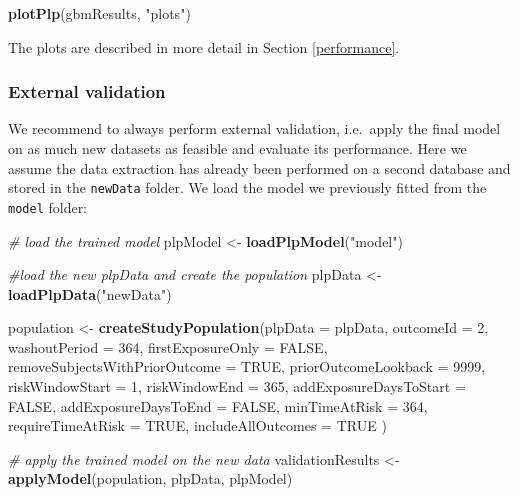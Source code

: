 \documentclass[11pt]{book}
\newenvironment{Shaded}{\begin{snugshade}}{\end{snugshade}}
\newcommand{\CommentTok}[1]{\textcolor[rgb]{0.56,0.35,0.01}{\textit{#1}}}
\newcommand{\DataTypeTok}[1]{\textcolor[rgb]{0.13,0.29,0.53}{#1}}
\newcommand{\DecValTok}[1]{\textcolor[rgb]{0.00,0.00,0.81}{#1}}
\newcommand{\KeywordTok}[1]{\textcolor[rgb]{0.13,0.29,0.53}{\textbf{#1}}}
\newcommand{\NormalTok}[1]{#1}
\newcommand{\OtherTok}[1]{\textcolor[rgb]{0.56,0.35,0.01}{#1}}
\newcommand{\StringTok}[1]{\textcolor[rgb]{0.31,0.60,0.02}{#1}}
\theoremstyle{definition}
\theoremstyle{definition}
\theoremstyle{definition}
\theoremstyle{remark}
\begin{document}
\begin{Shaded}
\begin{Highlighting}[]
\KeywordTok{plotPlp}\NormalTok{(gbmResults, }\StringTok{"plots"}\NormalTok{)}
\end{Highlighting}
\end{Shaded}

The plots are described in more detail in Section \ref{performance}.

\hypertarget{external-validation}{%
\subsubsection{External validation}\label{external-validation}}

We recommend to always perform external validation, i.e.~apply the final model on as much new datasets as feasible and evaluate its performance. Here we assume the data extraction has already been performed on a second database and stored in the \texttt{newData} folder. We load the model we previously fitted from the \texttt{model} folder:

\begin{Shaded}
\begin{Highlighting}[]
\CommentTok{# load the trained model}
\NormalTok{plpModel <-}\StringTok{ }\KeywordTok{loadPlpModel}\NormalTok{(}\StringTok{"model"}\NormalTok{)}

\CommentTok{#load the new plpData and create the population}
\NormalTok{plpData <-}\StringTok{ }\KeywordTok{loadPlpData}\NormalTok{(}\StringTok{"newData"}\NormalTok{)}

\NormalTok{population <-}\StringTok{ }\KeywordTok{createStudyPopulation}\NormalTok{(}\DataTypeTok{plpData =}\NormalTok{ plpData,}
                                    \DataTypeTok{outcomeId =} \DecValTok{2}\NormalTok{,}
                                    \DataTypeTok{washoutPeriod =} \DecValTok{364}\NormalTok{,}
                                    \DataTypeTok{firstExposureOnly =} \OtherTok{FALSE}\NormalTok{,}
                                    \DataTypeTok{removeSubjectsWithPriorOutcome =} \OtherTok{TRUE}\NormalTok{,}
                                    \DataTypeTok{priorOutcomeLookback =} \DecValTok{9999}\NormalTok{,}
                                    \DataTypeTok{riskWindowStart =} \DecValTok{1}\NormalTok{,}
                                    \DataTypeTok{riskWindowEnd =} \DecValTok{365}\NormalTok{,}
                                    \DataTypeTok{addExposureDaysToStart =} \OtherTok{FALSE}\NormalTok{,}
                                    \DataTypeTok{addExposureDaysToEnd =} \OtherTok{FALSE}\NormalTok{,}
                                    \DataTypeTok{minTimeAtRisk =} \DecValTok{364}\NormalTok{,}
                                    \DataTypeTok{requireTimeAtRisk =} \OtherTok{TRUE}\NormalTok{,}
                                    \DataTypeTok{includeAllOutcomes =} \OtherTok{TRUE}
\NormalTok{)}

\CommentTok{# apply the trained model on the new data}
\NormalTok{validationResults <-}\StringTok{ }\KeywordTok{applyModel}\NormalTok{(population, plpData, plpModel)}
\end{Highlighting}
\end{Shaded}
\end{document}
